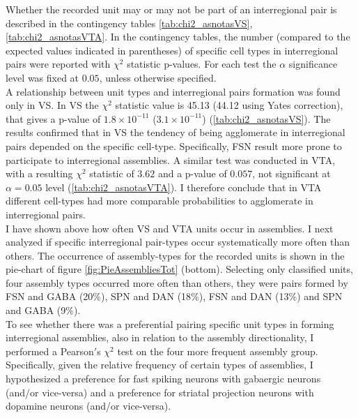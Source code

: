 Whether the recorded unit may or may not be part of an interregional pair is described  in the contingency tables \ref{tab:chi2_asnotasVS}, \ref{tab:chi2_asnotasVTA}. In the contingency tables, the number (compared to the expected values indicated in parentheses) of specific cell types in interregional pairs were reported with $\chi^2$ statistic p-values. For each test the $\alpha$ significance level was fixed at $0.05$, unless otherwise specified.\\A relationship between unit types and interregional pairs formation was found only in VS. In VS the $\chi^2$ statistic value is 45.13 (44.12 using Yates correction), that gives a p-value of $1.8\times10^{-11}$ ($3.1\times10^{-11}$) (\ref{tab:chi2_asnotasVS}). The results confirmed that in VS the tendency of being agglomerate in interregional pairs depended on the specific cell-type. Specifically, FSN result more prone to participate to interregional assemblies. A similar test was conducted in VTA, with a resulting $\chi^2$ statistic of $3.62$ and a p-value of $0.057$, not significant at $\alpha = 0.05$ level (\ref{tab:chi2_asnotasVTA}). I therefore conclude that in VTA different cell-types had more comparable probabilities to agglomerate in interregional pairs.\\I have shown above how often VS and VTA units occur in assemblies. I next analyzed if specific interregional pair-types occur systematically more often than others. The occurrence of assembly-types for the recorded units is shown in the pie-chart of figure \ref{fig:PieAssembliesTot} (bottom). Selecting only classified units, four assembly types occurred more often than others, they were pairs formed by FSN and GABA (20$\%$), SPN and DAN (18$\%$), FSN and DAN (13$\%$) and SPN and GABA (9$\%$).\\To see whether there was a preferential pairing specific unit types in forming interregional assemblies, also in relation to the assembly directionality, I performed a Pearson$'$s $\chi^2$ test on the four more frequent assembly group. Specifically, given the relative frequency of certain types of assemblies, I hypothesized a preference for fast spiking neurons with gabaergic neurons (and/or vice-versa) and a preference for striatal projection neurons with dopamine neurons (and/or vice-versa).
